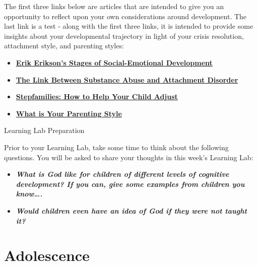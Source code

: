 \documentclass[
]{book}
\providecommand{\tightlist}{%
  \setlength{\itemsep}{0pt}\setlength{\parskip}{0pt}}
\begin{document}
\begin{reflect}
The first three links below are articles that are intended to give you an opportunity to reflect upon your own considerations around development. The last link is a test - along with the first three links, it is intended to provide some insights about your developmental trajectory in light of your crisis resolution, attachment style, and parenting styles:

\begin{itemize}
\tightlist
\item
  \href{http://www.childdevelopmentinfo.com/development/erickson.shtml}{\textbf{Erik Erikson's Stages of Social-Emotional Development}}\\
\item
  \href{http://www.attachmentdisorder.net/}{\textbf{The Link Between Substance Abuse and Attachment Disorder}}\\
\item
  \href{https://www.mayoclinic.org/healthy-lifestyle/childrens-health/in-depth/stepfamilies/art-20047046}{\textbf{Stepfamilies: How to Help Your Child Adjust}}\\
\item
  \href{https://www.3smartcubes.com/pages/tests/parentingstyle/parentingstyle_instructions/}{\textbf{What is Your Parenting Style}}
\end{itemize}

{Learning Lab Preparation}

Prior to your Learning Lab, take some time to think about the following questions. You will be asked to share your thoughts in this week's Learning Lab:

\begin{itemize}
\tightlist
\item
  \textbf{\emph{What is God like for children of different levels of cognitive development? If you can, give some examples from children you know\ldots.}}\\
\item
  \textbf{\emph{Would children even have an idea of God if they were not taught it?}}
\end{itemize}
\end{reflect}

\hypertarget{adolescence}{%
\section{Adolescence}\label{adolescence}}
\end{document}
